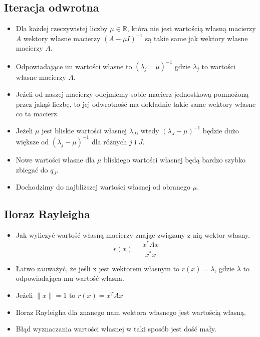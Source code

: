 \documentclass[a4paper]{article}
\begin{document}
\subsection{Iteracja odwrotna}
\begin{itemize}
    \item Dla każdej rzeczywistej liczby $\mu \in \mathbb{R}$, która nie jest wartością własną macierzy $A$ wektory własne macierzy $(A - \mu I)^{-1}$ są takie same jak wektory własne macierzy $A$.
    \item Odpowiadające im wartości własne to $(\lambda_j - \mu)^{-1}$ gdzie $\lambda_j$ to wartości własne macierzy $A$.
    \item Jeżeli od naszej macierzy odejmiemy sobie macierz jednostkową pomnożoną przez jakąś liczbę, to jej odwrotność ma dokładnie takie same wektory własne co ta macierz.
    \item Jeżeli $\mu$ jest bliskie wartości własnej $\lambda_J$, wtedy $(\lambda_J - \mu)^{-1}$ będzie dużo większe od $(\lambda_j - \mu)^{-1}$ dla różnych $j$ i $J$.
    \item Nowe wartości własne dla $\mu$ bliskiego wartości własnej będą bardzo szybko zbiegać do $q_J$.
    \item Dochodzimy do najbliższej wartości własnej od obranego $\mu$.
\end{itemize}

\subsection{Iloraz Rayleigha}
\begin{itemize}
    \item Jak wyliczyć wartość własną macierzy znając związany z nią wektor własny.
    \begin{equation*}
        r(x) = \frac{x^*Ax}{x^*x}
    \end{equation*}
    \item Łatwo zauważyć, że jeśli x jest wektorem własnym to $r(x) = \lambda$, gdzie $\lambda$ to odpowiadająca mu wartość własna. \item Jeżeli $\|x\| = 1$ to $r(x)=x^TAx$
    \item Iloraz Rayleigha dla znanego nam wektora własnego jest wartością własną.
    \item Błąd wyznaczania wartości własnej w taki sposób jest dość mały.
\end{itemize}
\end{document}

